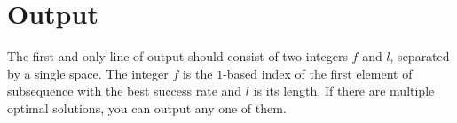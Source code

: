 \section*{Output}
The first and only line of output should consist of two integers $f$ and $l$, separated by a single space.
The integer $f$ is the $1$-based index of the first element of subsequence with the best success rate and $l$ is its length.
If there are multiple optimal solutions, you can output any one of them.

